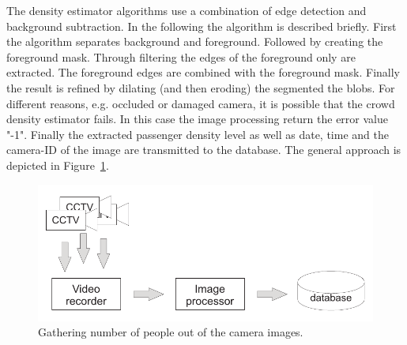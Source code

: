 The density estimator algorithms use a combination of edge detection and background subtraction. In the  following the algorithm is described briefly.
First the algorithm separates background and foreground. Followed by creating the foreground mask.
Through filtering the edges of the foreground only are extracted. The foreground edges are combined with the foreground mask. Finally the result is refined by dilating (and then eroding) the segmented the blobs. %
For different reasons, e.g. occluded or damaged camera, it is possible that the crowd density estimator fails. In this case the image processing return the error value "-1".
Finally the extracted passenger density level as well as date, time and the camera-ID of the image are transmitted to the database. The general approach is depicted in Figure~\ref{fig:CCTVimageProcessing}.

\begin{figure}[htbp]
  \centering
  \includegraphics[width=\linewidth]{Figures/imageProcessing.pdf} 
  \caption{Gathering number of people out of the camera images.}
  \label{fig:CCTVimageProcessing}
\end{figure}

